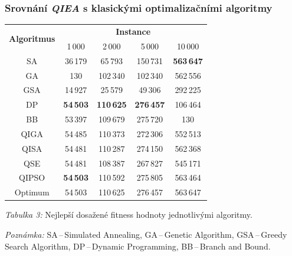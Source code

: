 \begin{frame}
  \footnotesize
  \frametitle{Srovnání \emph{QIEA} s klasickými optimalizačními algoritmy~\cite{cmp}}
  \centering
  \begin{tabular}{c c c c c}
    \toprule
    \multirow{2}{*}{\textbf{Algoritmus}} &
    \multicolumn{4}{c}{\textbf{Instance}} \\
          & 1\,000  & 2\,000   & 5\,000   & 10\,000 \\
    \midrule
    SA    & 36\,179 &  65\,793 & 150\,731 & \textbf{563\,647} \\[1ex]
    GA    &     130 & 102\,340 & 102\,340 & 562\,556 \\[1ex]
    GSA   & 14\,927 &  25\,579 &  49\,306 & 292\,225 \\[1ex]
    DP    & \textbf{54\,503} & \textbf{110\,625} & \textbf{276\,457} & 106\,464 \\[1ex]
    BB    & 53\,397 & 109\,679 & 275\,720 &      130 \\
    \midrule
    QIGA  & 54\,485 & 110\,373 & 272\,306 & 552\,513 \\[1ex]
    QISA  & 54\,481 & 110\,287 & 274\,150 & 562\,368 \\[1ex]
    QSE   & 54\,481 & 108\,387 & 267\,827 & 545\,171 \\[1ex]
    QIPSO & \textbf{54\,503} & 110\,592 & 275\,805 & 563\,464 \\
    \midrule
    Optimum & 54\,503 & 110\,625 & 276\,457 & 563\,647 \\
    \bottomrule
  \end{tabular}

  \vspace{1em}
  \scriptsize
  \emph{Tabulka 3:} Nejlepší dosažené fitness hodnoty jednotlivými algoritmy.

  \vspace{0.5em}
  \tiny
  \begin{center}
    \emph{Poznámka:}
    SA\,--\,Simulated Annealing,
    GA\,--\,Genetic Algorithm,
    GSA\,--\,Greedy Search Algorithm,
    DP\,--\,Dynamic Programming,
    BB\,--\,Branch and Bound.
  \end{center}
\end{frame}

